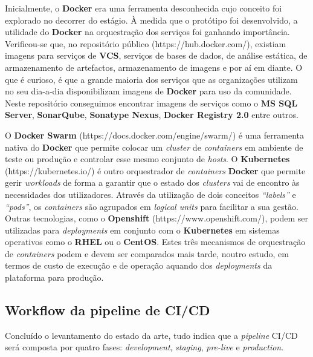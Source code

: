 \hspace{1cm}Inicialmente, o \textbf{Docker} era uma ferramenta desconhecida cujo conceito foi explorado no decorrer do estágio. À medida que o protótipo foi desenvolvido, a utilidade do \textbf{Docker} na orquestração dos serviços foi ganhando importância. Verificou-se que, no repositório público (https://hub.docker.com/), existiam imagens para serviços de \textbf{VCS}, serviços de bases de dados, de análise estática, de armazenamento de artefactos, armazenamento de imagens e por aí em diante. O que é curioso, é que a grande maioria dos serviços que as organizações utilizam no seu dia-a-dia disponibilizam imagens de \textbf{Docker} para uso da comunidade. Neste repositório conseguimos encontrar imagens de serviços como o \textbf{MS SQL Server}, \textbf{SonarQube}, \textbf{Sonatype Nexus}, \textbf{Docker Registry 2.0} entre outros.

\hspace{1cm}O \textbf{Docker Swarm} (https://docs.docker.com/engine/swarm/) é uma ferramenta nativa do \textbf{Docker} que permite colocar um \textit{cluster} de \textit{containers} em ambiente de teste ou produção e controlar esse mesmo conjunto de \textit{hosts}. O \textbf{Kubernetes} (https://kubernetes.io/) é outro orquestrador de \textit{containers} \textbf{Docker} que permite gerir \textit{workloads} de forma a garantir que o estado dos \textit{clusters} vai de encontro às necessidades dos utilizadores. Através da utilização de dois conceitos \textit{``labels''} e \textit{``pods''}, os \textit{containers} são agrupados em \textit{logical units} para facilitar a sua gestão. Outras tecnologias, como o \textbf{Openshift} (https://www.openshift.com/), podem ser utilizadas para \textit{deployments} em conjunto com o \textbf{Kubernetes} em sistemas operativos como o \textbf{RHEL} ou o \textbf{CentOS}. Estes três mecanismos de orquestração de \textit{containers} podem e devem ser comparados mais tarde, noutro estudo, em termos de custo de execução e de operação aquando dos \textit{deployments} da plataforma para produção.

\subsection{Workflow da pipeline de CI/CD}

\hspace{1cm}Concluído o levantamento do estado da arte, tudo indica que a \textit{pipeline} CI/CD será composta por quatro fases: \textit{development}, \textit{staging}, \textit{pre-live} e \textit{production}.

